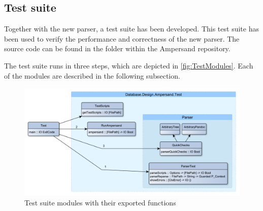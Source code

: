 
\subsection{Test suite}
  Together with the new parser, a test suite has been developed.
  This test suite has been used to verify the performance and correctness of the new parser.
  The source code can be found in the folder  within the Ampersand repository.

  The test suite runs in three steps, which are depicted in \autoref{fig:TestModules}.
  Each of the modules are described in the following subsection.
  \begin{figure}[ht]%
    \includegraphics[width=\columnwidth]{Figures/TestModules}
    \caption{Test suite modules with their exported functions}
    \label{fig:TestModules}
  \end{figure}%

